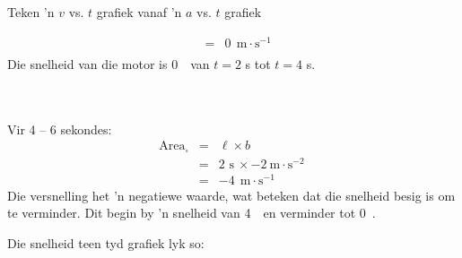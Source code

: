 \begin{wex}{Teken 'n $v$ vs. $t$ grafiek vanaf 'n $a$ vs. $t$ grafiek}
{\begin{minipage}{0.3\textwidth}
\begin{eqnarray*}
&=&0\ ~\text{m}\cdot \text{s}^{-1}\\
\end{eqnarray*}
Die snelheid van die motor is 0~\ms ~van $t=2$ s tot $t=4$ s.\\
\\
\\
\end{minipage}
\begin{minipage}{0.03\textwidth}
\begin{center}
\end{center}
\end{minipage}
\begin{minipage}{0.3\textwidth}
Vir 4 -- 6 sekondes:
\begin{eqnarray*}
\text{Area}_{\square} &=& \ell \times b\\
&=& 2\text{~s}\ \times -2~\text{m}\cdot \text{s}^{-2}\ \\
&=&-4\ ~\text{m}\cdot \text{s}^{-1}
\end{eqnarray*}
Die versnelling het 'n negatiewe waarde, wat beteken dat die snelheid besig is om te verminder. Dit begin by 'n snelheid van 4~\ms ~en verminder tot 0~\ms.\\
\end{minipage}

\begin{minipage}{0.3\textwidth}
Die snelheid teen tyd grafiek lyk so:
\end{minipage}
\begin{minipage}{0.7\textwidth}
\begin{center}
\end{center}
\end{minipage}
}
\end{wex}

